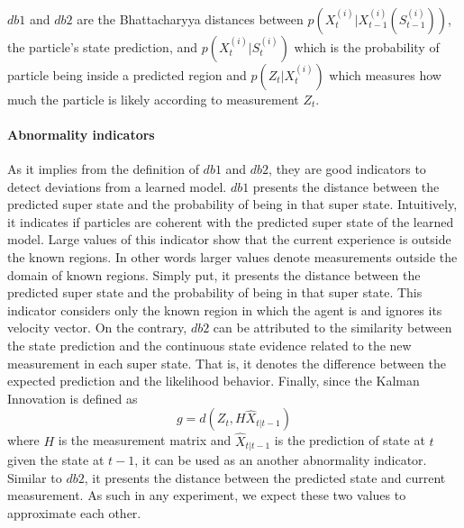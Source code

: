 \documentclass{article}
\begin{document}
\begin{multicols}{2}
    
    \paragraph{} $db1$ and $db2$ are the Bhattacharyya distances \cite{bhattacharyya-1943-on-a-measure-of-divergence-between-two-statistical-populations-defined-by-probability-distributions} between $p(X^{(i)}_{t}|X^{(i)}_{t-1}(S^{(i)}_{t-1}))$, the particle's state prediction, and $p(X_{t}^{(i)}|S_{t}^{(i)})$ which is the probability of particle being inside a predicted region and $p(Z_{t}|X_{t}^{(i)})$ which measures how much the particle is likely according to measurement $Z_{t}$. 
       
    \paragraph{Abnormality indicators} As it implies from the definition of $db1$ and $db2$, they are good indicators to detect deviations from a learned model. $db1$ presents the distance between the predicted super state and the probability of being in that super state. Intuitively, it indicates if particles are coherent with  the predicted super state of the learned model. Large values of this indicator show that the current experience is outside the known regions. In other words larger values denote measurements outside the domain of known regions. Simply put, it presents the distance between the predicted super state and the probability of being in that super state. This indicator considers only the known region in which the agent is and ignores its velocity vector. On the contrary, $db2$ can be attributed to the similarity between the state prediction and the continuous state evidence related to the new measurement in each super state. That is, it denotes the difference between the expected prediction and the likelihood behavior.  Finally, since the Kalman Innovation is defined as 
    \begin{equation}
        g = d(Z_t,H\hat{X}_{t|t-1})
    \end{equation}
    where $H$ is the measurement matrix and $\hat{X}_{t|t-1}$ is the prediction of state at $t$ given the state at $t-1$, it can be used as an another abnormality indicator. Similar to $db2$, it presents the distance between the predicted state and current measurement.  As such in any experiment, we expect these two values to approximate each other. 
        
        

\end{multicols}
\end{document}
